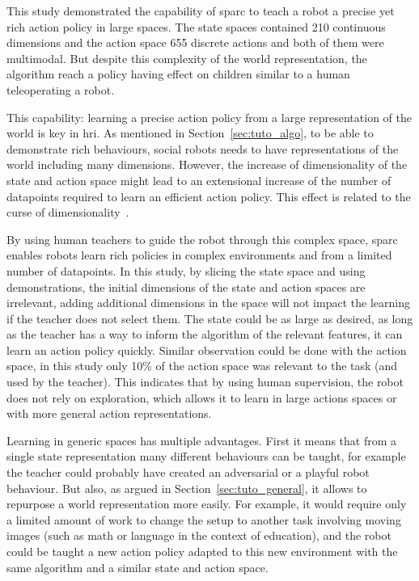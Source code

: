 This study demonstrated the capability of \gls{sparc} to teach a robot a precise yet rich action policy in large spaces. The state spaces contained 210 continuous dimensions and the action space 655 discrete actions and both of them were multimodal. But despite this complexity of the world representation, the algorithm reach a policy having effect on children similar to a human teleoperating a robot. 

This capability: learning a precise action policy from a large representation of the world is key in \gls{hri}. As mentioned in Section~\ref{sec:tuto_algo}, to be able to demonstrate rich behaviours, social robots needs to have representations of the world including many dimensions. However, the increase of dimensionality of the state and action space might lead to an extensional increase of the number of datapoints required to learn an efficient action policy. This effect is related to the curse of dimensionality~\citep{bellman1957dynamic}. 

By using human teachers to guide the robot through this complex space, \gls{sparc} enables robots learn rich policies in complex environments and from a limited number of datapoints. In this study, by slicing the state space and using demonstrations, the initial dimensions of the state and action spaces are irrelevant, adding additional dimensions in the space will not impact the learning if the teacher does not select them. The state could be as large as desired, as long as the teacher has a way to inform the algorithm of the relevant features, it can learn an action policy quickly. Similar observation could be done with the action space, in this study only 10\% of the action space was relevant to the task (and used by the teacher). This indicates that by using human supervision, the robot does not rely on exploration, which allows it to learn in large actions spaces or with more general action representations. 

Learning in generic spaces has multiple advantages. First it means that from a single state representation many different behaviours can be taught, for example the teacher could probably have created an adversarial or a playful robot behaviour. But also, as argued in Section~\ref{sec:tuto_general}, it allows to repurpose a world representation more easily. For example, it would require only a limited amount of work to change the setup to another task involving moving images (such as math or language in the context of education), and the robot could be taught a new action policy adapted to this new environment with the same algorithm and a similar state and action space. 

